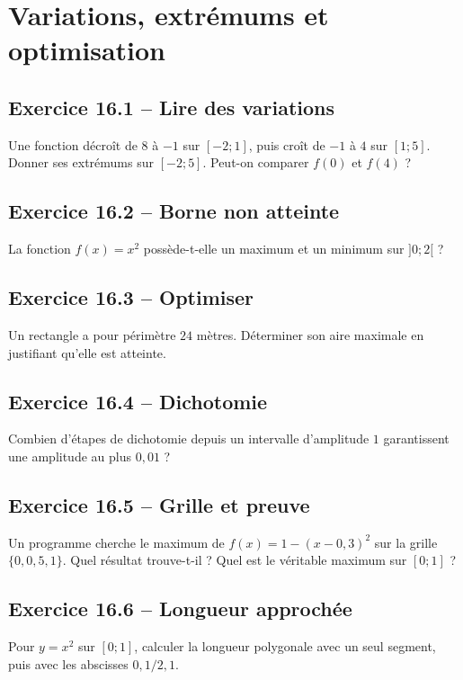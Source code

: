 \chapter{Variations, extrémums et optimisation}
\section*{Exercice 16.1 -- Lire des variations}
Une fonction décroît de $8$ à $-1$ sur $[-2;1]$, puis croît de $-1$ à $4$ sur $[1;5]$. Donner ses extrémums sur $[-2;5]$. Peut-on comparer $f(0)$ et $f(4)$ ?

\section*{Exercice 16.2 -- Borne non atteinte}
La fonction $f(x)=x^2$ possède-t-elle un maximum et un minimum sur $]0;2[$ ?

\section*{Exercice 16.3 -- Optimiser}
Un rectangle a pour périmètre $24$ mètres. Déterminer son aire maximale en justifiant qu'elle est atteinte.

\section*{Exercice 16.4 -- Dichotomie}
Combien d'étapes de dichotomie depuis un intervalle d'amplitude $1$ garantissent une amplitude au plus $0{,}01$ ?

\section*{Exercice 16.5 -- Grille et preuve}
Un programme cherche le maximum de $f(x)=1-(x-0{,}3)^2$ sur la grille $\{0,0{,}5,1\}$. Quel résultat trouve-t-il ? Quel est le véritable maximum sur $[0;1]$ ?

\section*{Exercice 16.6 -- Longueur approchée}
Pour $y=x^2$ sur $[0;1]$, calculer la longueur polygonale avec un seul segment, puis avec les abscisses $0,1/2,1$.
